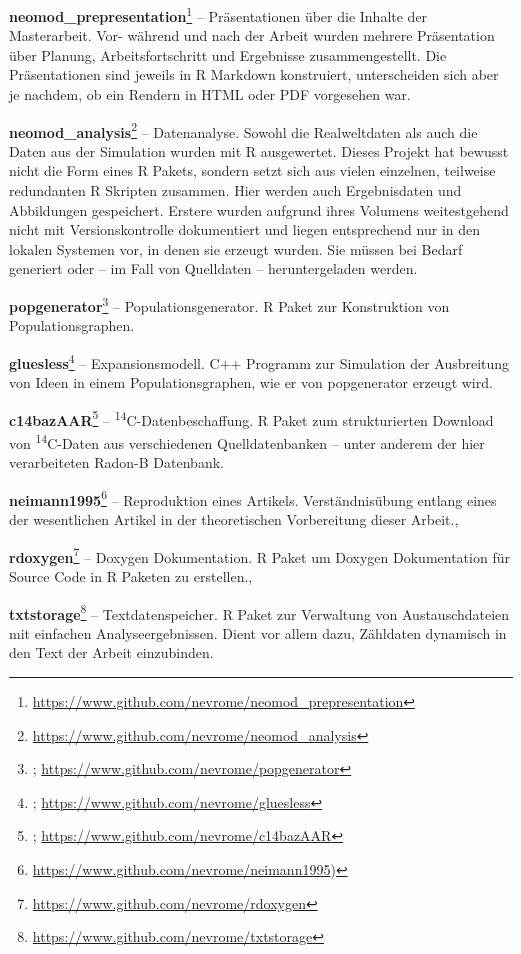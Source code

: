\documentclass[openany,twoside,twocolumn]{book}
\let\rmarkdownfootnote\footnote%
\def\footnote{\protect\rmarkdownfootnote}
\begin{document}
\textbf{neomod\_prepresentation}\footnote{\url{https://www.github.com/nevrome/neomod_prepresentation}}
-- Präsentationen über die Inhalte der Masterarbeit. Vor- während und
nach der Arbeit wurden mehrere Präsentation über Planung,
Arbeitsfortschritt und Ergebnisse zusammengestellt. Die Präsentationen
sind jeweils in R Markdown konstruiert, unterscheiden sich aber je
nachdem, ob ein Rendern in HTML oder PDF vorgesehen war.

\textbf{neomod\_analysis}\footnote{\url{https://www.github.com/nevrome/neomod_analysis}}
-- Datenanalyse. Sowohl die Realweltdaten als auch die Daten aus der
Simulation wurden mit R ausgewertet. Dieses Projekt hat bewusst nicht
die Form eines R Pakets, sondern setzt sich aus vielen einzelnen,
teilweise redundanten R Skripten zusammen. Hier werden auch
Ergebnisdaten und Abbildungen gespeichert. Erstere wurden aufgrund ihres
Volumens weitestgehend nicht mit Versionskontrolle dokumentiert und
liegen entsprechend nur in den lokalen Systemen vor, in denen sie
erzeugt wurden. Sie müssen bei Bedarf generiert oder -- im Fall von
Quelldaten -- heruntergeladen werden.

\textbf{popgenerator}\footnote{\textcite{schmid_popgenerator_2018};
  \url{https://www.github.com/nevrome/popgenerator}} --
Populationsgenerator. R Paket zur Konstruktion von Populationsgraphen.

\textbf{gluesless}\footnote{\textcite{clemens_schmid_gluesless_2018};
  \url{https://www.github.com/nevrome/gluesless}} -- Expansionsmodell.
C++ Programm zur Simulation der Ausbreitung von Ideen in einem
Populationsgraphen, wie er von popgenerator erzeugt wird.

\textbf{c14bazAAR}\footnote{\textcite{schmid_c14bazaar_2018};
  \url{https://www.github.com/nevrome/c14bazAAR}} --
\textsuperscript{14}C-Datenbeschaffung. R Paket zum strukturierten
Download von \textsuperscript{14}C-Daten aus verschiedenen
Quelldatenbanken -- unter anderem der hier verarbeiteten Radon-B
Datenbank.

\textbf{neimann1995}\footnote{\url{https://www.github.com/nevrome/neimann1995})}
-- Reproduktion eines Artikels. Verständnisübung entlang eines der
wesentlichen Artikel in der theoretischen Vorbereitung dieser Arbeit.,

\textbf{rdoxygen}\footnote{\url{https://www.github.com/nevrome/rdoxygen}}
-- Doxygen Dokumentation. R Paket um Doxygen Dokumentation für Source
Code in R Paketen zu erstellen.,

\textbf{txtstorage}\footnote{\url{https://www.github.com/nevrome/txtstorage}}
-- Textdatenspeicher. R Paket zur Verwaltung von Austauschdateien mit
einfachen Analyseergebnissen. Dient vor allem dazu, Zähldaten dynamisch
in den Text der Arbeit einzubinden.
\end{document}
